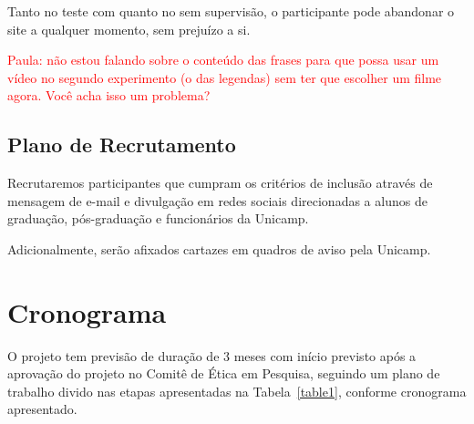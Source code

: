 \documentclass[a4paper,11pt,titlepage,singlespacing]{article}
\newcommand\todo[1]{\textcolor{red}{#1}}
\begin{document}
Tanto no teste com quanto no sem supervisão, o participante pode abandonar o site a qualquer momento, sem prejuízo a si.

\todo{Paula: não estou falando sobre o conteúdo das frases para que possa usar um vídeo no segundo experimento (o das legendas) sem ter que escolher um filme agora. Você acha isso um problema?}





\subsection{Plano de Recrutamento}

\noindent Recrutaremos participantes que cumpram os critérios de inclusão através de mensagem de e-mail e divulgação em redes sociais direcionadas a alunos de graduação, pós-graduação e funcionários da Unicamp.

Adicionalmente, serão afixados cartazes em quadros de aviso pela Unicamp.

\section{Cronograma}
\noindent O projeto tem previsão de duração de 3 meses com início previsto após a aprovação do projeto no Comitê de Ética em Pesquisa, seguindo um plano de trabalho divido nas etapas apresentadas na Tabela~\ref{table1}, conforme cronograma apresentado.
\end{document}
